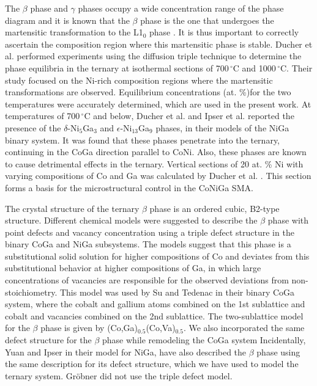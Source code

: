 \documentclass[article]{elsarticle}
\begin{document}
The $\beta$ phase and $\gamma$ phases occupy a wide concentration range of the phase diagram and it is known that
the $\beta$ phase is the one that undergoes the martensitic transformation to the L1$_{0}$ phase \cite{Duch08,Oik02}.
It is thus important to correctly ascertain the composition region where this martensitic phase is stable. Ducher et
al. \cite{Duch08,Hao84,Zha04} performed experiments using the diffusion triple technique to determine the phase equilibria in
the ternary at isothermal sections of 700$\,^{\circ}\mathrm{C}$ and 1000$\,^{\circ}\mathrm{C}$. Their study focused on
the Ni-rich composition regions where the martensitic transformations are observed. Equilibrium concentrations (at. \%)for the
two temperatures were accurately determined, which are used in the present work. At temperatures of
700$\,^{\circ}\mathrm{C}$ and below, Ducher et al. \cite{Duch07} and Ipser et al.\cite{Ipser04} reported
the presence of the $\delta$-Ni$_{5}$Ga$_{3}$ and $\epsilon$-Ni$_{13}$Ga$_{9}$ phases, in their
models of the NiGa binary system. It was found that these phases penetrate into the ternary,
continuing in the CoGa direction parallel to CoNi. Also, these phases are known to
cause detrimental effects in the ternary. Vertical sections of 20 at. \% Ni with varying
compositions of Co and Ga was calculated by Ducher et al. \cite{Duch08}. This section forms
a basis for the microstructural control in the CoNiGa SMA.

The crystal structure of the ternary $\beta$ phase is an ordered cubic, B2-type structure.
Different chemical models were suggested \cite{82Wuns,81Omm,75Bern,99Dup,73Wat} to
describe the $\beta$ phase with point defects and vacancy concentration using a
triple defect structure in the binary CoGa and NiGa subsystems. The models suggest that this phase is a substitutional
solid solution for higher compositions of Co and deviates from this
substitutional behavior at higher compositions of Ga, in which large
concentrations of vacancies are responsible for the observed deviations from
non-stoichiometry. This model was used by Su and Tedenac \cite{05Su} in their binary CoGa system,
where the cobalt and
gallium atoms combined on the 1st sublattice and cobalt and vacancies combined
on the 2nd sublattice. The two-sublattice model for the $\beta$ phase is given
by (Co,Ga)$_{\text{0.5}}$(Co,Va)$_{\text{0.5}}$. We also incorporated the same
defect structure for the $\beta$ phase while remodeling the CoGa system\cite{Cha10}
Incidentally, Yuan and Ipser\cite{Ipser04} in their model for NiGa, have also described the $\beta$
phase using the same description for its defect structure, which we have
used to model the ternary system. Gr\"{o}bner \cite{99Grob} did not use the triple defect
model.
\end{document}
